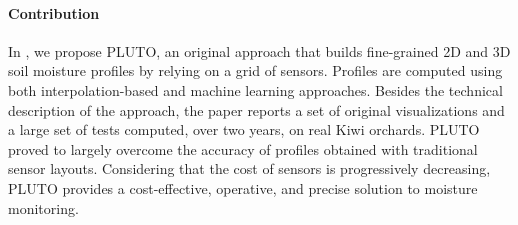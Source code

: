 \paragraph{Contribution} In , we propose PLUTO, an original approach that builds fine-grained 2D and 3D soil moisture profiles by relying on a grid of sensors.
Profiles are computed using both interpolation-based and machine learning approaches. Besides the technical description of the approach, the paper reports a set of original visualizations and a large set of tests computed, over two years, on real Kiwi orchards.
PLUTO proved to largely overcome the accuracy of profiles obtained with traditional sensor layouts.
Considering that the cost of sensors is progressively decreasing, PLUTO provides a cost-effective, operative, and precise solution to moisture monitoring.






